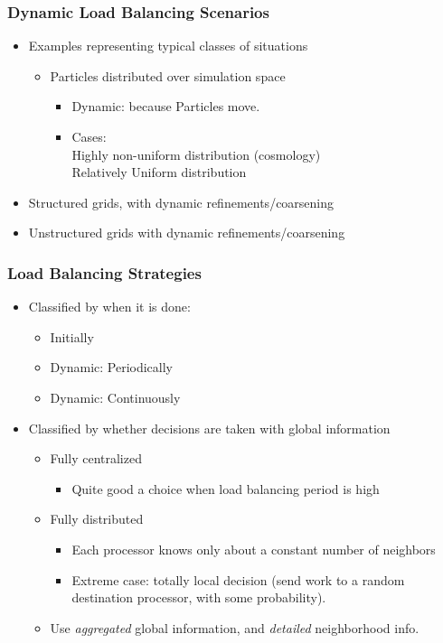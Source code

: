 \begin{frame}[fragile]
\frametitle{Dynamic Load Balancing Scenarios}
\begin{itemize}
 \item Examples representing typical classes of situations
 \begin{itemize}
  \item Particles distributed over simulation space
  \begin{itemize}
   \item Dynamic: because Particles move.
   \item Cases:\\
   Highly non-uniform distribution (cosmology)\\
   Relatively Uniform distribution 
  \end{itemize}
 \end{itemize}
\item Structured grids, with dynamic refinements/coarsening
\item Unstructured grids with dynamic refinements/coarsening
\end{itemize}
\end{frame}

\begin{frame}[fragile]
\frametitle{Load Balancing Strategies}
\begin{itemize}
 \item Classified by when it is done:
 \begin{itemize}
  \item Initially
  \item Dynamic: Periodically
  \item Dynamic: Continuously
 \end{itemize}
 \item Classified by whether decisions are taken with global information
 \begin{itemize}
  \item Fully centralized
  \begin{itemize}
   \item Quite good a choice when load balancing period is high
  \end{itemize}
 \item Fully distributed
 \begin{itemize}
  \item Each processor knows only about a constant number of neighbors
  \item Extreme case: totally local decision (send work to a random destination processor, with some probability).
 \end{itemize}
\item Use \emph{aggregated} global  information, and \emph{detailed} neighborhood info.
\end{itemize}
\end{itemize}
\end{frame}

